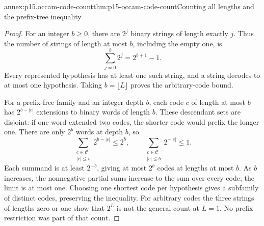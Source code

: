 \begin{annexitem}{annex:p15.occam-code-count}{thm:p15-occam-code-count}{Counting all lengths and the prefix-tree inequality}
\begin{proof}
For an integer \(b\geq0\), there are \(2^j\) binary strings
of length exactly \(j\). Thus the number of strings of
length at most \(b\), including the empty one, is
\[
                \sum_{j=0}^b2^j=2^{b+1}-1.
\]
Every represented hypothesis has at least one such string,
and a string decodes to at most one hypothesis. Taking
\(b=\lfloor L\rfloor\) proves the arbitrary-code bound.

For a prefix-free family and an integer depth \(b\), each
code \(c\) of length at most \(b\) has \(2^{b-|c|}\)
extensions to binary words of length \(b\).
These descendant sets are disjoint: if one word extended
two codes, the shorter code would prefix the longer one.
There are only \(2^b\) words at depth \(b\), so
\[
 \sum_{\substack{c\in\mathcal C\\|c|\leq b}}2^{b-|c|}\leq2^b,
 \qquad
 \sum_{\substack{c\in\mathcal C\\|c|\leq b}}2^{-|c|}\leq1.
\]
Each summand is at least \(2^{-b}\), giving at most
\(2^b\) codes at lengths at most \(b\).
As \(b\) increases, the nonnegative partial sums increase
to the sum over every code; the limit is at most one.
Choosing one shortest code per hypothesis gives a subfamily
of distinct codes, preserving the inequality.
For arbitrary codes the three strings of lengths zero
or one show that \(2^L\) is not the general count
at \(L=1\). No prefix restriction was part of that count.
\end{proof}
\end{annexitem}

